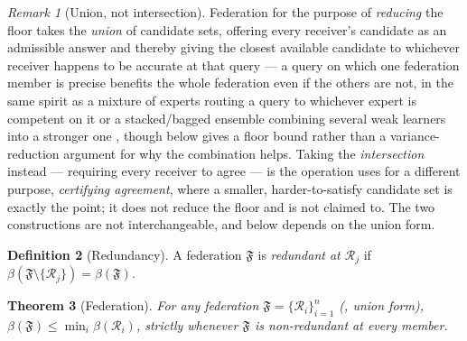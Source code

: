\documentclass[11pt,twocolumn,a4paper]{article}
\theoremstyle{rdm}
\newtheorem{theorem}{Theorem}[section]
\theoremstyle{definition}
\newtheorem{definition}[theorem]{Definition}
\theoremstyle{remark}
\newtheorem{remark}[theorem]{Remark}
\newcommand{\flo}{\beta}
\newcommand{\Rec}{\mathcal{R}}
\newcommand{\Fed}{\mathfrak{F}}
\begin{document}
\begin{remark}[Union, not intersection]
\label{rem:union-not-intersection}
Federation for the purpose of \emph{reducing} the floor takes the
\emph{union} of candidate sets, offering every receiver's candidate as an
admissible answer and thereby giving the closest available candidate to
whichever receiver happens to be accurate at that query --- a query on
which one federation member is precise benefits the whole federation even
if the others are not, in the same spirit as a mixture of experts routing a
query to whichever expert is competent on it
\citep{jacobs1991,shazeer2017} or a stacked/bagged ensemble combining
several weak learners into a stronger one
\citep{wolpert1992,breiman2001,dietterich2000}, though 
below gives a floor bound rather than a variance-reduction argument for why
the combination helps. Taking the \emph{intersection} instead --- requiring
every receiver to agree --- is the operation  uses for a
different purpose, \emph{certifying agreement}, where a smaller,
harder-to-satisfy candidate set is exactly the point; it does not reduce
the floor and is not claimed to. The two constructions are not
interchangeable, and  below depends on the union
form.
\end{remark}

\begin{definition}[Redundancy]
\label{def:redundancy}
A federation $\Fed$ is \emph{redundant at $\Rec_j$} if
$\flo(\Fed\setminus\{\Rec_j\}) = \flo(\Fed)$.
\end{definition}

\begin{theorem}[Federation]
\label{thm:federation}
For any federation $\Fed=\{\Rec_i\}_{i=1}^n$ (, union
form), $\flo(\Fed) \le \min_i \flo(\Rec_i)$, strictly whenever $\Fed$ is
non-redundant at every member.
\end{theorem}
\end{document}
